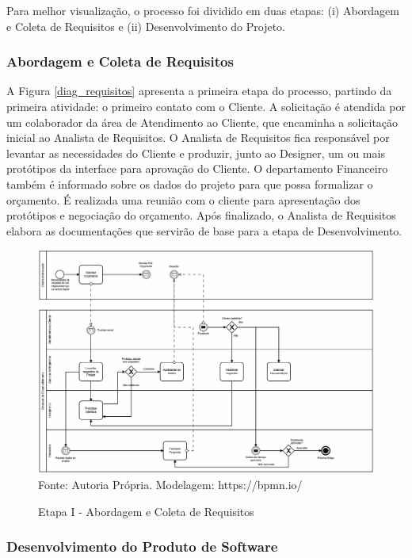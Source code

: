\documentclass[	DIV=calc,%
							paper=a4,%
							fontsize=12pt,%
							onecolumn]{scrartcl}	 					%
\begin{document}
Para melhor visualização, o processo foi dividido em duas etapas: (i) Abordagem e Coleta de Requisitos e (ii) Desenvolvimento do Projeto.

\subsubsection{Abordagem e Coleta de Requisitos}

A Figura \ref{diag_requisitos} apresenta a primeira etapa do processo, partindo da primeira atividade: o primeiro contato com o Cliente. A solicitação é atendida por um colaborador da área de Atendimento ao Cliente, que encaminha a solicitação inicial ao Analista de Requisitos. O Analista de Requisitos fica responsável por levantar as necessidades do Cliente e produzir, junto ao Designer, um ou mais protótipos da interface para aprovação do Cliente. O departamento Financeiro também é informado sobre os dados do projeto para que possa formalizar o orçamento. É realizada uma reunião com o cliente para apresentação dos protótipos e negociação do orçamento. Após finalizado, o Analista de Requisitos elabora as documentações que servirão de base para a etapa de Desenvolvimento. 

\begin{figure}[!h]
	\caption{Etapa I - Abordagem e Coleta de Requisitos}
	\centering
	\includegraphics[width=\textwidth]{Requisitos}
	{Fonte: Autoria Própria. Modelagem: https://bpmn.io/}
\end{figure}\label{diag_requisitos}

\subsubsection{Desenvolvimento do Produto de Software}
 
\end{document}
